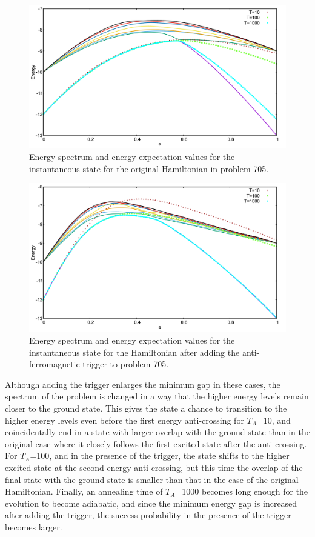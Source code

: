 \documentclass[../main.tex]{subfiles}
\begin{document}
\begin{figure}[H]
\centering 
\includegraphics[scale=0.24]{705_O_T.png}
\caption{Energy spectrum and energy expectation values for the instantaneous state for the original Hamiltonian in problem 705. }
\label{fig:a24}
\end{figure}
\begin{figure}[H]
\centering 
\includegraphics[scale=0.24]{705_A_T_g1.png}
\caption{Energy spectrum and energy expectation values for the instantaneous state for the Hamiltonian after adding the anti-ferromagnetic trigger to problem 705.}
\label{fig:a25}
\end{figure}
Although adding the trigger enlarges the minimum gap in these cases, the spectrum of the problem is changed in a way that the higher energy levels remain closer to the ground state. This gives the state a chance to transition to the higher energy levels even before the first energy anti-crossing for $T_A$=10, and coincidentally end in a state with larger overlap with the ground state than in the original case where it closely follows the first excited state after the anti-crossing. For $T_A$=100, and in the presence of the trigger, the state shifts to the higher excited state at the second energy anti-crossing, but this time the overlap of the final state with the ground state is smaller than that in the case of the original Hamiltonian. Finally, an annealing time of $T_A$=1000 becomes long enough for the evolution to become adiabatic, and since the minimum energy gap is increased after adding the trigger, the success probability in the presence of the trigger becomes larger.\\
\end{document}
